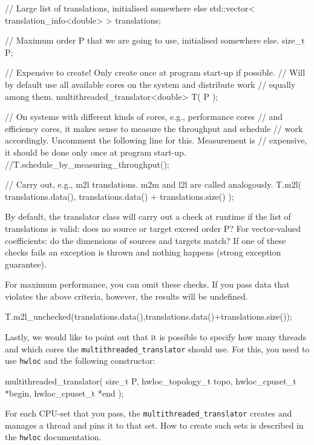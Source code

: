 \documentclass{scrbook}
\begin{document}
\begin{cppcode*}
// Large list of translations, initialised somewhere else
std::vector< translation_info<double> > translations;

// Maximum order P that we are going to use, initialised somewhere else.
size_t P;

// Expensive to create! Only create once at program start-up if possible.
// Will by default use all available cores on the system and distribute work
// equally among them.
multithreaded_translator<double> T( P );

// On systems with different kinds of cores, e.g., performance cores
// and efficiency cores, it makes sense to measure the throughput and schedule
// work accordingly. Uncomment the following line for this. Measurement is
// expensive, it should be done only once at program start-up.
//T.schedule_by_measuring_throughput();

// Carry out, e.g., m2l translations. m2m and l2l are called analogously.
T.m2l( translations.data(), translations.data() + translations.size() );
\end{cppcode*}

By default, the translator class will carry out a check at runtime if the
list of translations is valid: does no source or target exceed order P? For
vector-valued coefficients: do the dimensions of sources and targets match?
If one of these checks fails an exception is thrown and nothing happens
(strong exception guarantee).

For maximum performance, you can omit these checks. If you pass data that
violates the above criteria, however, the results will be undefined.
\begin{cppcode*}
T.m2l_unchecked(translations.data(),translations.data()+translations.size());
\end{cppcode*}

Lastly, we would like to point out that it is possible to specify how many
threads and which cores the \lstinline|multithreaded_translator| should use.
For this, you need to use \lstinline|hwloc| and the following constructor:
\begin{cppcode*}
multithreaded_translator( size_t P, hwloc_topology_t topo,
                          hwloc_cpuset_t *begin, hwloc_cpuset_t *end );
\end{cppcode*}
For each CPU-set that you pass, the \lstinline|multithreaded_translator| creates
and manages a thread and pins it to that set. How to create such sets is
described in the \lstinline|hwloc| documentation.
\end{document}
